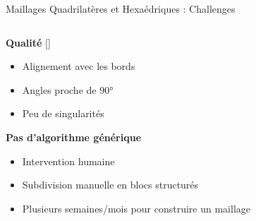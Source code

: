 \begin{frame}{Maillages Quadrilatères et Hexaédriques : Challenges}
    \begin{columns}[T] %
        \begin{column}{.5\textwidth}
            \textbf{Qualité} [\cite{knupp_remarks_2007}]
            \begin{itemize}
                \item Alignement avec les bords
                \item Angles proche de 90°
                \item Peu de singularités
            \end{itemize}
            
            \textbf{Pas d’algorithme générique}
            \begin{itemize}
                \item Intervention humaine
                \item Subdivision manuelle en blocs structurés
                \item Plusieurs semaines/mois pour construire un maillage
            \end{itemize}
        \end{column}%
        

\end{columns}
\end{frame}
